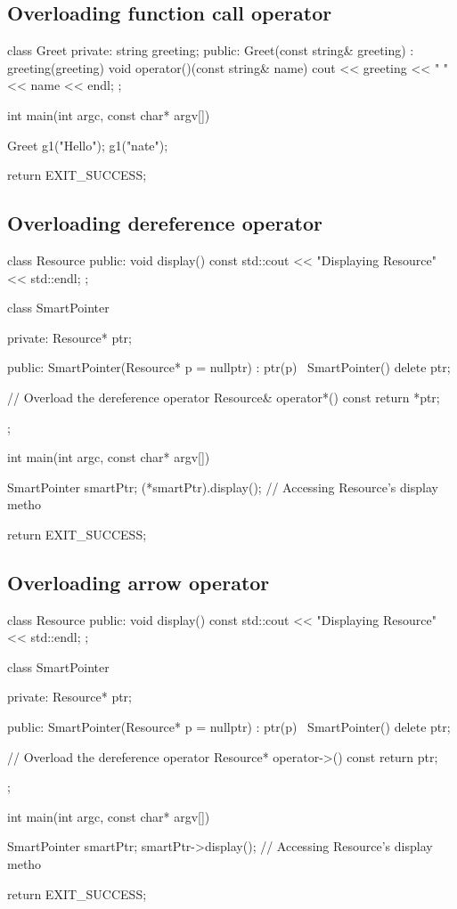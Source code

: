 \documentclass{report}
\begin{document}
    \bigbreak \noindent 
    \subsection{Overloading function call operator}
    \bigbreak \noindent 
    \begin{cppcode}
class Greet {
private:
    string greeting; 
public:
    Greet(const string& greeting) : greeting(greeting) {}
    void operator()(const string& name) {
        cout << greeting << " " << name << endl;
    }
};

int main(int argc, const char* argv[]) {
    Greet g1("Hello");
    g1("nate");

    return EXIT_SUCCESS;
}
    \end{cppcode}

    \pagebreak
    \subsection{Overloading dereference operator}
    \bigbreak \noindent 
    \begin{cppcode}
class Resource {
public:
    void display() const { std::cout << "Displaying Resource" << std::endl; }
};

class SmartPointer {
private:
    Resource* ptr;

public:
    SmartPointer(Resource* p = nullptr) : ptr(p) {}
    ~SmartPointer() { delete ptr; }

    // Overload the dereference operator
    Resource& operator*() const { return *ptr; }
};

int main(int argc, const char* argv[]) {
     SmartPointer smartPtr;
    (*smartPtr).display();  // Accessing Resource's display metho
    
    return EXIT_SUCCESS;
}
    \end{cppcode}
    \bigbreak \noindent 
    \subsection{Overloading arrow operator}
    \bigbreak \noindent 
    \begin{cppcode}
class Resource {
public:
    void display() const { std::cout << "Displaying Resource" << std::endl; }
};

class SmartPointer {
private:
    Resource* ptr;

public:
    SmartPointer(Resource* p = nullptr) : ptr(p) {}
    ~SmartPointer() { delete ptr; }

    // Overload the dereference operator
    Resource* operator->() const { return ptr; }
};

int main(int argc, const char* argv[]) {
     SmartPointer smartPtr;
    smartPtr->display();  // Accessing Resource's display metho
    
    return EXIT_SUCCESS;
}
    \end{cppcode}
\end{document}

